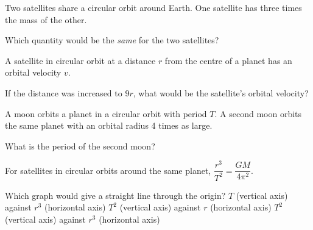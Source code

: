 \documentclass[12pt]{article}
\begin{document}
\begin{quizq}{}
Two satellites share a circular orbit around Earth. One satellite has three times the mass of the
other.

Which quantity would be the \emph{same} for the two satellites?
\end{quizq}

\begin{quizq}{}
A satellite in circular orbit at a distance $r$ from the centre of a planet has an orbital
velocity $v$.

If the distance was increased to $9r$, what would be the satellite's orbital velocity?
\end{quizq}

\begin{quizq}{}
A moon orbits a planet in a circular orbit with period $T$. A second moon orbits the same planet
with an orbital radius 4 times as large.

What is the period of the second moon?
\end{quizq}

\begin{quizq}{}
For satellites in circular orbits around the same planet, $\dfrac{r^3}{T^2} = \dfrac{GM}{4\pi^2}$.

Which graph would give a straight line through the origin?
  {$T$ (vertical axis) against $r^3$ (horizontal axis)}
  {$T^2$ (vertical axis) against $r$ (horizontal axis)}
  {$T^2$ (vertical axis) against $r^3$ (horizontal axis)}
\end{quizq}
\end{document}
